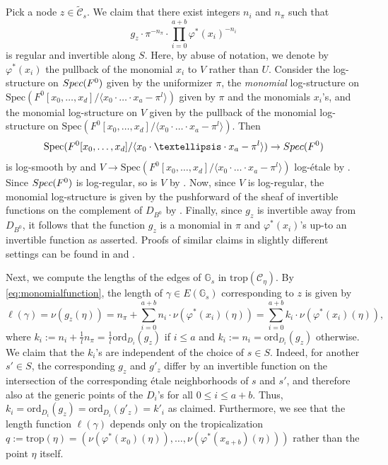 \documentclass[11pt,reqno]{amsart}
\numberwithin{equation}{section}
\theoremstyle{definition}
\newcommand{\trop}{\mathrm{trop}}
\newcommand{\Spec}{{\rm Spec}}
\newcommand{\GG}{{\mathbb G}}
\newcommand{\cC}{{\mathcal{C}}}
\theoremstyle{remark}
\begin{document}
Pick a node $z\in \widetilde{\cC}_s$. We claim that there exist integers $n_i$ and $n_\pi$ such that 
\begin{equation}\label{eq:monomialfunction}
g_z\cdot\pi^{-n_\pi}\cdot\prod_{i=0}^{a+b} \varphi^*(x_i)^{-n_i}
\end{equation}
is regular and invertible along $S$. Here, by abuse of notation, we denote by $\varphi^*(x_i)$ the pullback of the monomial $x_i$ to $V$ rather than $U$. Consider the log-structure on $\Spec(F^0)$ given by the uniformizer $\pi$, the {\em monomial} log-structure on $\mathrm{Spec}(F^0[x_0,\dotsc,x_d]/\langle x_0\cdot\ldots\cdot x_a-\pi^l\rangle)$ given by $\pi$ and the monomials $x_i$'s, and the monomial log-structure on $V$ given by the pullback of the monomial log-structure on $\mathrm{Spec}(F^0[x_0,\dotsc,x_d]/\langle x_0\cdot\ldots\cdot x_a-\pi^l\rangle)$. Then $$\mathrm{Spec}(F^0[x_0,\dotsc,x_d]/\langle x_0\cdot\ldots\cdot x_a-\pi^l\rangle)\to \Spec(F^0)$$ is log-smooth by \cite[\S 8.1]{Kato94} and $V\to \mathrm{Spec}(F^0[x_0,\dotsc,x_d]/\langle x_0\cdot\ldots\cdot x_a-\pi^l\rangle)$ log-\'etale by \cite[Proposition~3.8]{Kato89}. Since $\Spec(F^0)$ is log-regular, so is $V$ by \cite[\S 8.2]{Kato94}. Now, since $V$ is log-regular, the monomial log-structure is given by the pushforward of the sheaf of invertible functions on the complement of $D_{B^0}$ by \cite[Theorem~11.6]{Kato94}. Finally, since $g_z$ is invertible away from $D_{B^0}$, it follows that the function $g_z$ is a monomial in $\pi$ and $\varphi^*(x_i)$'s up-to an invertible function as asserted. Proofs of similar claims in slightly different settings can be found in \cite[Lemma~4.8.2]{Wlo22} and \cite[Proposition~2.11]{Gubler07}.

Next, we compute the lengths of the edges of $\GG_s$ in $\trop(\cC_\eta)$. By \eqref{eq:monomialfunction}, the length of $\gamma\in E(\mathbb G_s)$ corresponding to $z$ is given by 
$$
\ell(\gamma)=\nu(g_z(\eta))=n_\pi+\sum_{i=0}^{a+b}n_i\cdot \nu\left(\varphi^*(x_i)(\eta)\right)=\sum_{i=0}^{a+b}k_i\cdot \nu\left(\varphi^*(x_i)(\eta)\right),
$$
where $k_i:=n_i+\frac{1}{l}n_\pi=\frac{1}{l}\mathrm{ord}_{D_i}(g_z)$ if $i\le a$ and $k_i:=n_i=\mathrm{ord}_{D_i}(g_z)$ otherwise. We claim that the $k_i$'s are independent of the choice of $s\in S$. Indeed, for another $s'\in S$, the corresponding $g_z$ and $g'_z$ differ by an invertible function on the intersection of the corresponding \'etale neighborhoods of $s$ and $s'$, and therefore also at the generic points of the $D_i$'s for all $0\leq i\leq a+b$. Thus, $k_i=\mathrm{ord}_{D_i}(g_z)=\mathrm{ord}_{D_i}(g'_z)=k'_i$ as claimed. Furthermore, we see that the length function $\ell(\gamma)$ depends only on the tropicalization $q:=\trop(\eta)=\left(\nu\left(\varphi^*(x_0)(\eta)\right),\dotsc, \nu\left(\varphi^*(x_{a+b})(\eta)\right)\right)$ rather than the point $\eta$ itself.
 
\end{document}
